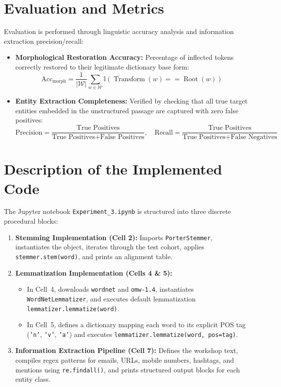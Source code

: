 \section{Evaluation and Metrics}
Evaluation is performed through linguistic accuracy analysis and information extraction precision/recall:
\begin{itemize}
    \item \textbf{Morphological Restoration Accuracy:} Percentage of inflected tokens correctly restored to their legitimate dictionary base form:
    \begin{equation}
        \text{Acc}_{\text{morph}} = \frac{1}{|\mathcal{W}|} \sum_{w \in \mathcal{W}} \mathbb{I}(\operatorname{Transform}(w) == \operatorname{Root}(w))
    \end{equation}
    \item \textbf{Entity Extraction Completeness:} Verified by checking that all true target entities embedded in the unstructured passage are captured with zero false positives:
    \begin{equation}
        \text{Precision} = \frac{\text{True Positives}}{\text{True Positives} + \text{False Positives}}, \quad \text{Recall} = \frac{\text{True Positives}}{\text{True Positives} + \text{False Negatives}}
    \end{equation}
\end{itemize}

\section{Description of the Implemented Code}
The Jupyter notebook \texttt{Experiment\_3.ipynb} is structured into three discrete procedural blocks:
\begin{enumerate}
    \item \textbf{Stemming Implementation (Cell 2):} Imports \texttt{PorterStemmer}, instantiates the object, iterates through the test cohort, applies \texttt{stemmer.stem(word)}, and prints an alignment table.
    \item \textbf{Lemmatization Implementation (Cells 4 \& 5):} 
    \begin{itemize}
        \item In Cell~4, downloads \texttt{wordnet} and \texttt{omw-1.4}, instantiates \texttt{WordNetLemmatizer}, and executes default lemmatization \texttt{lemmatizer.lemmatize(word)}.
        \item In Cell~5, defines a dictionary mapping each word to its explicit POS tag (\texttt{'n'}, \texttt{'v'}, \texttt{'a'}) and executes \texttt{lemmatizer.lemmatize(word, pos=tag)}.
    \end{itemize}
    \item \textbf{Information Extraction Pipeline (Cell 7):} Defines the workshop text, compiles regex patterns for emails, URLs, mobile numbers, hashtags, and mentions using \texttt{re.findall()}, and prints structured output blocks for each entity class.
\end{enumerate}

